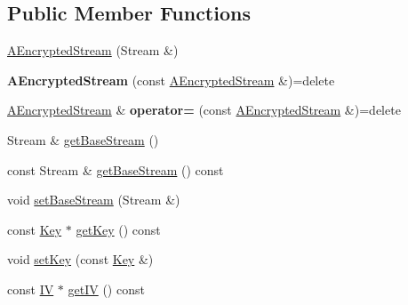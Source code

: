 \subsection*{Public Member Functions}
\begin{DoxyCompactItemize}
\item 
\mbox{\hyperlink{classathome_1_1arduino_1_1_a_encrypted_stream_a39ed0c93b084f19762c7576434402f99}{A\+Encrypted\+Stream}} (Stream \&)
\item 
\mbox{\label{classathome_1_1arduino_1_1_a_encrypted_stream_a985741cc41ca9816f8146e12657b5a43}} 
{\bfseries A\+Encrypted\+Stream} (const \mbox{\hyperlink{classathome_1_1arduino_1_1_a_encrypted_stream}{A\+Encrypted\+Stream}} \&)=delete
\item 
\mbox{\label{classathome_1_1arduino_1_1_a_encrypted_stream_a65b67d7946841e1cc9f16c3af010d90b}} 
\mbox{\hyperlink{classathome_1_1arduino_1_1_a_encrypted_stream}{A\+Encrypted\+Stream}} \& {\bfseries operator=} (const \mbox{\hyperlink{classathome_1_1arduino_1_1_a_encrypted_stream}{A\+Encrypted\+Stream}} \&)=delete
\item 
Stream \& \mbox{\hyperlink{classathome_1_1arduino_1_1_a_encrypted_stream_aed97c06297924317ac09e82bb583f6b2}{get\+Base\+Stream}} ()
\item 
const Stream \& \mbox{\hyperlink{classathome_1_1arduino_1_1_a_encrypted_stream_ae774c9286ddaa3bafef0ada36e3ed71d}{get\+Base\+Stream}} () const
\item 
void \mbox{\hyperlink{classathome_1_1arduino_1_1_a_encrypted_stream_a123e12bccac92a0253e1df61c7e66207}{set\+Base\+Stream}} (Stream \&)
\item 
const \mbox{\hyperlink{classathome_1_1arduino_1_1_a_encrypted_stream_a2f0fd4a9c2a74a4ae857a4447aa3956f}{Key}} $\ast$ \mbox{\hyperlink{classathome_1_1arduino_1_1_a_encrypted_stream_a7ca085a57f3566e1fdd63fddb136ab11}{get\+Key}} () const
\item 
void \mbox{\hyperlink{classathome_1_1arduino_1_1_a_encrypted_stream_a83d9b4d1374a46d5793709f774c1e03a}{set\+Key}} (const \mbox{\hyperlink{classathome_1_1arduino_1_1_a_encrypted_stream_a2f0fd4a9c2a74a4ae857a4447aa3956f}{Key}} \&)
\item 
const \mbox{\hyperlink{classathome_1_1arduino_1_1_a_encrypted_stream_a4a0c027bc7503bb0da538d6a2f0657e6}{IV}} $\ast$ \mbox{\hyperlink{classathome_1_1arduino_1_1_a_encrypted_stream_a6e6f53fbe976a42a84deb8adf3ef5045}{get\+IV}} () const

\end{DoxyCompactItemize}
